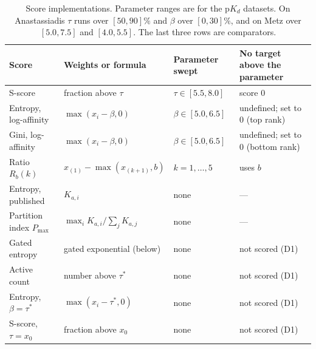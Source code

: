 \begin{table}[h]
  \centering
  \caption{Score implementations. Parameter ranges are for the
           $\mathrm{p}K_d$ datasets. On Anastassiadis $\tau$ runs over
           $[50, 90]\%$ and $\beta$ over $[0, 30]\%$, and on Metz over
           $[5.0, 7.5]$ and $[4.0, 5.5]$. The last three rows are comparators.}
  \label{tab:implementations}
  \footnotesize
  \setlength{\tabcolsep}{3pt}
  \begin{tabular}{p{}p{}p{}p{}}
    \toprule
    Score & Weights or formula & Parameter swept & No target above the parameter \\
    \midrule
    S-score                    & fraction above $\tau$                  & $\tau \in [5.5, 8.0]$ & score $0$ \\
    Entropy, log-affinity      & $\max(x_i - \beta, 0)$                 & $\beta \in [5.0, 6.5]$ & undefined; set to $0$ (top rank) \\
    Gini, log-affinity         & $\max(x_i - \beta, 0)$                 & $\beta \in [5.0, 6.5]$ & undefined; set to $0$ (bottom rank) \\
    Ratio $R_b(k)$             & $x_{(1)} - \max(x_{(k+1)}, b)$         & $k = 1, \ldots, 5$     & uses $b$ \\
    Entropy, published         & $K_{a,i}$                              & none                   & --- \\
    Partition index $P_{\max}$ & $\max_i K_{a,i} / \sum_j K_{a,j}$      & none                   & --- \\
    Gated entropy              & gated exponential (below) & none  & not scored (D1) \\
    Active count               & number above $\tau^*$                  & none                   & not scored (D1) \\
    Entropy, $\beta = \tau^*$  & $\max(x_i - \tau^*, 0)$                & none                   & not scored (D1) \\
    S-score, $\tau = x_0$      & fraction above $x_0$                   & none                   & not scored (D1) \\
    \bottomrule
  \end{tabular}
\end{table}

